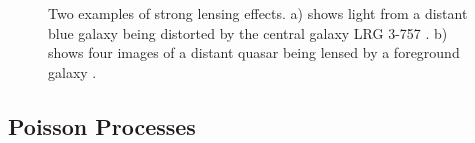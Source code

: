 \documentclass[a4paper,11pt]{article}
\begin{document}
   \begin{figure}
   \centering
   \qquad
   \caption{Two examples of strong lensing effects. a) shows light from
   a distant blue galaxy being distorted by the central galaxy LRG 3-757
   \cite{einsteinring}. b) shows four images of a distant quasar being lensed by a
   foreground galaxy \cite{eincross}.}
   \label{fig:stronglens}
   \end{figure}
\subsection{Poisson Processes}
\label{sec-2-2}
\end{document}
